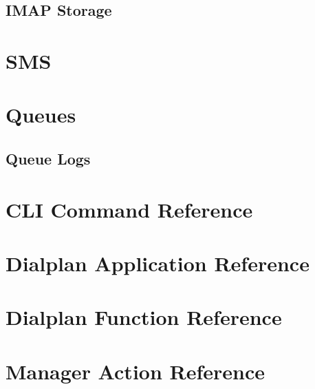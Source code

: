 \documentclass[12pt,a4]{report}
\begin{document}
  \section{IMAP Storage}
  

\chapter{SMS}


\chapter{Queues}
  
  \section{Queue Logs}
  

\chapter{CLI Command Reference}


\chapter{Dialplan Application Reference}


\chapter{Dialplan Function Reference}


\chapter{Manager Action Reference}


\end{document}
